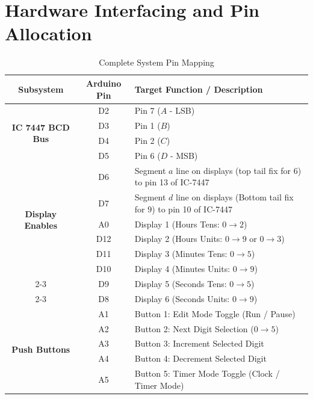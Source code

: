 \documentclass[journal,12pt,onecolumn]{IEEEtran}
\begin{document}
		\section{Hardware Interfacing and Pin Allocation}
		\begin{table}[H]
			\centering
			\caption{Complete System Pin Mapping}
			\label{tab:pin_connections}
			\begin{tabular}{|c|c|l|}
				\hline
				\textbf{Subsystem} & \textbf{Arduino Pin} & \textbf{Target Function / Description} \\ \hline
				\multirow{4}{*}{\textbf{IC 7447 BCD Bus}} 
				& D2 & Pin 7 ($A$ - LSB) \\ \cline{2-3}
				& D3 & Pin 1 ($B$) \\ \cline{2-3}
				& D4 & Pin 2 ($C$) \\ \cline{2-3}
				& D5 & Pin 6 ($D$ - MSB) \\ \hline
				\multirow{6}{*}{\textbf{Display Enables}} 
				& D6 & Segment $a$ line on displays (top tail fix for $6$) to pin 13 of IC-7447\\ \cline{2-3}
				& D7 & Segment $d$ line on displays (Bottom tail fix for $9$) to pin 10 of IC-7447\\ \cline{2-3}
				& A0 & Display 1 (Hours Tens: $0\to2$) \\ \cline{2-3}
				& D12 & Display 2 (Hours Units: $0\to9$ or $0\to3$) \\ \cline{2-3}
				& D11 & Display 3 (Minutes Tens: $0\to5$) \\ \cline{2-3}
				& D10 & Display 4 (Minutes Units: $0\to9$) \\ \cline{2-3}
				& D9 & Display 5 (Seconds Tens: $0\to5$) \\ \cline{2-3}
				& D8 & Display 6 (Seconds Units: $0\to9$) \\ \hline
				\multirow{5}{*}{\textbf{Push Buttons}} 
				& A1 & Button 1: Edit Mode Toggle (Run / Pause) \\ \cline{2-3}
				& A2 & Button 2: Next Digit Selection ($0 \to 5$) \\ \cline{2-3}
				& A3 & Button 3: Increment Selected Digit \\ \cline{2-3}
				& A4 & Button 4: Decrement Selected Digit \\ \cline{2-3}
				& A5  & Button 5: Timer Mode Toggle (Clock / Timer Mode) \\ \hline
			\end{tabular}
		\end{table}
		
\end{document}
